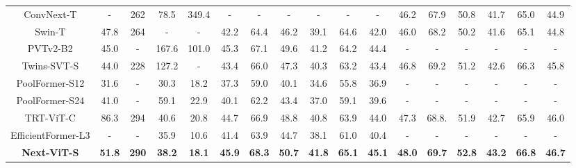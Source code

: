 \documentclass[10pt,twocolumn,letterpaper]{article}
\begin{document}
\begin{table*}[]
{\begin{tabular}{c|cc|cc|cccccc|cccccc}
ConvNext-T\cite{ConvNext}            & -      & 262    & 78.5  & 349.4     & -  & - & - & - & - & - &46.2 & 67.9& 50.8 &41.7 & 65.0 & 44.9          \\
    Swin-T\cite{Swin}            & 47.8      & 264    & -  & -     & 42.2          & 64.4          & 46.2          & 39.1          & 64.6          & 42.0          & 46.0          & 68.2          & 50.2          & 41.6          & 65.1          & 44.8          \\
    PVTv2-B2\cite{PVT_v2}            & 45.0      & -    & 167.6  & 101.0    & 45.3 &67.1 &49.6 &41.2 &64.2 &44.4          & -          & -          & -          & -          & -          & -          \\
    Twins-SVT-S\cite{Twins}      & 44.0      & 228   & 127.2  & -     & 43.4          & 66.0          & 47.3          & 40.3          & 63.2          & 43.4          & 46.8          & 69.2          & 51.2          & 42.6          & 66.3          & 45.8          \\
    PoolFormer-S12\cite{metaformer}       & 31.6    & -    & 30.3  & 18.2  &37.3   &59.0   &40.1   &34.6   &55.8   &36.9   &-  & -   &-    & -     &-     & -     \\
    PoolFormer-S24\cite{metaformer}       & 41.0    & -    &59.1   &22.9   &40.1   &62.2   &43.4   &37.0   &59.1   &39.6   &-  & -   &-    & -     &-     & -     \\
    TRT-ViT-C\cite{xia2022trt}       & 86.3      & 294    &40.6   &20.8     &44.7         & 66.9          &48.8         & 40.8         &63.9         & 44.0          &47.3         &68.8.   &51.9 &42.7           &65.9       &46.0        \\
    EfficientFormer-L3\cite{li2022efficientformer}     & -      & -   &35.9   &  10.6   & 41.4          & 63.9          & 44.7          & 38.1          & 61.0          & 40.4          & -          & -          & -          & -         & -          & -          \\
    \textbf{Next-ViT-S}         & \textbf{51.8}      & \textbf{290}   &\textbf{38.2}   &\textbf{18.1}      &\textbf{45.9}          &\textbf{68.3}          & \textbf{50.7}         & \textbf{41.8}          & \textbf{65.1}          & \textbf{45.1}          & \textbf{48.0}         & \textbf{69.7}          &\textbf{52.8}          &\textbf{43.2}          &\textbf{66.8}         & \textbf{46.7}          \\
     

\end{tabular}}
\end{table*}
\end{document}
